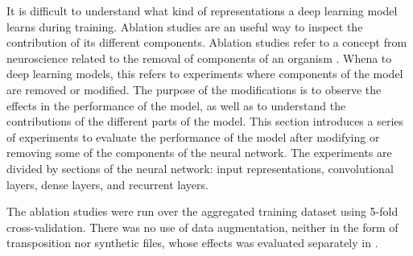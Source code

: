 
It is difficult to understand what kind of representations a
deep learning model learns during training. Ablation studies
are an useful way to inspect the contribution of its
different components. Ablation studies refer to a concept
from neuroscience related to the removal of components of an
organism \parencite{meyes2019ablation}. Whena to deep
learning models, this refers to experiments where components
of the model are removed or modified. The purpose of the
modifications is to observe the effects in the performance
of the model, as well as to understand the contributions of
the different parts of the model. This section introduces a
series of experiments to evaluate the performance of the
model after modifying or removing some of the components of
the neural network. The experiments are divided by sections
of the neural network: input representations, convolutional
layers, dense layers, and recurrent layers.

The ablation studies were run over the aggregated training
dataset using 5-fold cross-validation. There was no use of
data augmentation, neither in the form of transposition nor
synthetic files, whose effects was evaluated separately in
.
